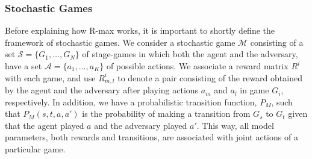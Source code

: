 \subsubsection{Stochastic Games}
Before explaining how R-max works, it is important to shortly define the framework of stochastic games. We consider a stochastic game $\mathcal{M}$ consisting of a set $\mathcal{S}= \lbrace G_1,\ldots,G_N \rbrace$ of stage-games in which both the agent and the adversary, have a set $\mathcal{A}= \lbrace a_1,\ldots,a_K \rbrace$ of possible actions. We associate a reward matrix $R^i$ with each game, and use $R^i_{m,l}$ to denote a pair consisting of the reward obtained by the agent and the adversary after playing actions $a_m$ and $a_l$ in game $G_i$, respectively. In addition, we have a probabilistic transition function, $P_M$, such that $P_M(s,t,a,a')$ is the probability of making a transition from $G_s$ to $G_t$ given that the agent played $a$ and the adversary played $a'$. This way, all model
parameters, both rewards and transitions, are associated with joint actions of a particular game.

